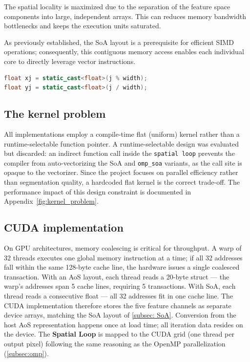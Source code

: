\documentclass[10pt,twocolumn,letterpaper]{article}
\begin{document}
The spatial locality is maximized due to the separation of the feature space components into large, independent arrays. This can reduces memory bandwidth bottlenecks and keeps the execution units saturated.

As previously established, the SoA layout is a prerequisite for efficient SIMD operations; consequently, this contiguous memory access enables each individual core to directly leverage vector instructions.

\begin{lstlisting}[language=C++, caption={baseline spatial indexing}, label={code:aos_spatial}]
float xj = static_cast<float>(j % width);
float yj = static_cast<float>(j / width);
\end{lstlisting}

\subsection{The kernel problem}\label{subsec:kernel_choice}
All implementations employ a compile-time flat (uniform) kernel rather than a runtime-selectable function pointer. A runtime-selectable design was evaluated but discarded: an indirect function call inside the \texttt{spatial loop} prevents the compiler from auto-vectorizing the SoA and \texttt{omp\_soa} variants, as the call site is opaque to the vectorizer. Since the project focuses on parallel efficiency rather than segmentation quality, a hardcoded flat kernel is the correct trade-off. The performance impact of this design constraint is documented in Appendix~\ref{fig:kernel_problem}.


\subsection{CUDA implementation}\label{subsec:cuda_impl}
On GPU architectures, memory coalescing is critical for throughput. A warp of 32 threads executes one global memory instruction at a time; if all 32 addresses fall within the same 128-byte cache line, the hardware issues a single coalesced transaction. With an AoS layout, each thread reads a 20-byte struct — the warp's addresses span 5 cache lines, requiring 5 transactions. With SoA, each thread reads a consecutive float — all 32 addresses fit in one cache line. The CUDA implementation therefore stores the five feature channels as separate device arrays, matching the SoA layout of \cref{subsec: SoA}. Conversion from the host AoS representation happens once at load time; all iteration data resides on the device.  The \textbf{Spatial Loop} is mapped to the CUDA grid (one thread per output pixel) following the same reasoning as the OpenMP parallelization (\cref{subsec:omp}). 
\end{document}

